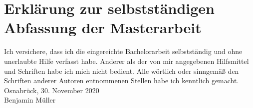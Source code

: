 \chapter*{Erklärung zur selbstständigen Abfassung der Masterarbeit}

Ich versichere, dass ich die eingereichte Bachelorarbeit selbstständig und ohne unerlaubte Hilfe verfasst habe. Anderer als der von mir angegebenen Hilfsmittel und Schriften habe ich mich nicht bedient. Alle wörtlich oder sinngemäß den Schriften anderer Autoren entnommenen Stellen habe ich kenntlich gemacht. \\


\bigskip
\bigskip
\bigskip
\bigskip
\noindent
Osnabrück, 30. November 2020 \\

\bigskip
\bigskip
\bigskip
\bigskip
\noindent
Benjamin Müller